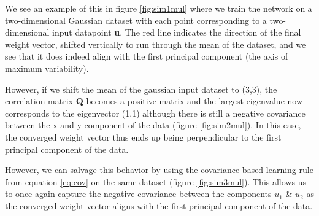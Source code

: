 \documentclass{article}
\begin{document}
We see an example of this in figure \ref{fig:sim1mul} where we train the network on a two-dimensional Gaussian dataset with each point corresponding to a two-dimensional input datapoint \textbf{u}. The red line indicates the direction of the final weight vector, shifted vertically to run through the mean of the dataset, and we see that it does indeed align with the first principal component (the axis of maximum variability).

However, if we shift the mean of the gaussian input dataset to (3,3), the correlation matrix \textbf{Q} becomes a positive matrix and the largest eigenvalue now corresponds to the eigenvector (1,1) although there is still a negative covariance between the x and y component of the data (figure \ref{fig:sim2mul}). In this case, the converged weight vector thus ends up being perpendicular to the first principal component of the data.

However, we can salvage this behavior by using the covariance-based learning rule from equation \ref{eq:cov} on the same dataset (figure \ref{fig:sim3mul}). This allows us to once again capture the negative covariance between the components $u_1$ \& $u_2$ as the converged weight vector aligns with the first principal component of the data.
\end{document}
